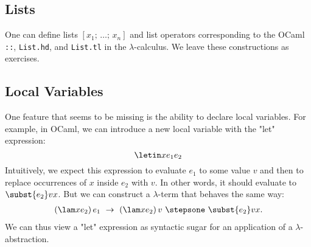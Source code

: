 \subsection{Lists}

One can define lists $[x_1;\,\ldots;\,x_n]$ and list operators corresponding to the OCaml \texttt{::}, \texttt{List.hd}, and \texttt{List.tl} in the $\lambda$-calculus.  We leave these constructions as exercises.

\subsection{Local Variables}

One feature that seems to be missing is the ability to declare local
variables. For example, in OCaml, we can introduce a new local
variable with the "let" expression:
\[
\letin x{e_1}{e_2}
\]
Intuitively, we expect this expression to evaluate $e_1$ to some value
$v$ and then to replace occurrences of $x$ inside $e_2$ with $v$.
In other words, it should evaluate to $\subst{e_2}vx$. But we
can construct a $\lambda$-term that behaves the same way:
\begin{align*}
(\lam x{e_2})\,e_1\ \rightarrow\ (\lam x{e_2})\,v\ \stepsone\ \subst{e_2}vx.
\end{align*}
We can thus view a "let" expression as syntactic sugar for an application of a $\lambda$-abstraction.

\nocite{Barendregt84}
